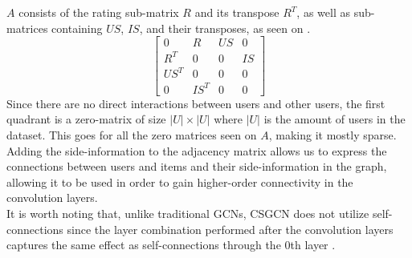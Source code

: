 $A$ consists of the rating sub-matrix $R$ and its transpose $R^T$, as well as sub-matrices containing $US$, $IS$, and their transposes, as seen on .
\begin{equation}\label{csgcn_is_adj_mat}
    \begin{bmatrix}
    0 & R & US & 0\\
    R^T & 0 & 0 & IS\\
    US^T & 0 & 0 & 0 \\
    0 & IS^T & 0 & 0
    \end{bmatrix}
\end{equation}
Since there are no direct interactions between users and other users, the first quadrant is a zero-matrix of size $|U|\times|U|$ where $|U|$ is the amount of users in the dataset.
This goes for all the zero matrices seen on $A$, making it mostly sparse.
Adding the side-information to the adjacency matrix allows us to express the connections between users and items and their side-information in the graph, allowing it to be used in order to gain higher-order connectivity in the convolution layers.\\
It is worth noting that, unlike traditional GCNs, CSGCN does not utilize self-connections since the layer combination performed after the convolution layers captures the same effect as self-connections through the 0th layer \cite{LightGCN}.

